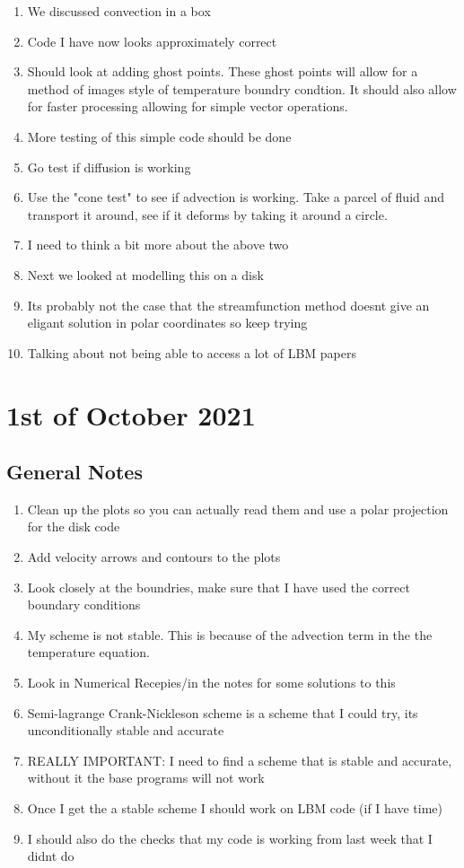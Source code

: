 \documentclass{article}
\begin{document}
\begin{enumerate}
	\item We discussed convection in a box
	\item Code I have now looks approximately correct
	\item Should look at adding ghost points. These ghost points will allow for a method of images style of temperature boundry condtion. It should also allow for faster processing allowing for simple vector operations.
	\item More testing of this simple code should be done
	\item Go test if diffusion is working
	\item Use the "cone test" to see if advection is working. Take a parcel of fluid and transport it around, see if it deforms by taking it around a circle.
	\item I need to think a bit more about the above two
	\item Next we looked at modelling this on a disk
	\item Its probably not the case that the streamfunction method doesnt give an eligant solution in polar coordinates so keep trying
	\item Talking about not being able to access a lot of LBM papers
\end{enumerate}

\section*{1st of October 2021}

\subsection*{General Notes}

\begin{enumerate}

	\item Clean up the plots so you can actually read them and use a polar projection for the disk code
	\item Add velocity arrows and contours to the plots
	\item Look closely at the boundries, make sure that I have used the correct boundary conditions
	\item My scheme is not stable. This is because of the advection term in the the temperature equation.
	\item Look in Numerical Recepies/in the notes for some solutions to this
	\item Semi-lagrange Crank-Nickleson scheme is a scheme that I could try, its unconditionally stable and accurate
	\item REALLY IMPORTANT: I need to find a scheme that is stable and accurate, without it the base programs will not work
	\item Once I get the a stable scheme I should work on LBM code (if I have time)
	\item I should also do the checks that my code is working from last week that I didnt do

\end{enumerate}
\end{document}

